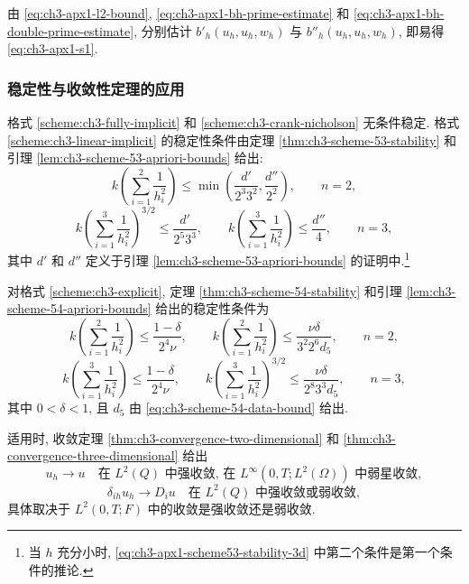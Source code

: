 \begin{Proof}
由 \eqref{eq:ch3-apx1-l2-bound}, \eqref{eq:ch3-apx1-bh-prime-estimate} 和 \eqref{eq:ch3-apx1-bh-double-prime-estimate}, 分别估计 $b'_h(u_h,u_h,w_h)$ 与 $b''_h(u_h,u_h,w_h)$, 即易得 \eqref{eq:ch3-apx1-s1}.
\end{Proof}

\subsubsection{稳定性与收敛性定理的应用}
格式 \ref{scheme:ch3-fully-implicit} 和 \ref{scheme:ch3-crank-nicholson} 无条件稳定. 格式 \ref{scheme:ch3-linear-implicit} 的稳定性条件由定理 \ref{thm:ch3-scheme-53-stability} 和引理 \ref{lem:ch3-scheme-53-apriori-bounds} 给出:
\begin{equation}
k\left(\sum_{i=1}^2\frac1{h_i^2}\right)
\leq\min\left(\frac{d'}{2^3 3^2},\frac{d''}{2^2}\right),
\qquad n=2,
\label{eq:ch3-apx1-scheme53-stability-2d}
\end{equation}
\begin{equation}
k\left(\sum_{i=1}^3\frac1{h_i^2}\right)^{3/2}\leq\frac{d'}{2^5 3^3},
\qquad
k\left(\sum_{i=1}^3\frac1{h_i^2}\right)\leq\frac{d''}{4},
\qquad n=3,
\label{eq:ch3-apx1-scheme53-stability-3d}
\end{equation}
其中 $d'$ 和 $d''$ 定义于引理 \ref{lem:ch3-scheme-53-apriori-bounds} 的证明中.\footnote{当 $h$ 充分小时, \eqref{eq:ch3-apx1-scheme53-stability-3d} 中第二个条件是第一个条件的推论.}

对格式 \ref{scheme:ch3-explicit}, 定理 \ref{thm:ch3-scheme-54-stability} 和引理 \ref{lem:ch3-scheme-54-apriori-bounds} 给出的稳定性条件为
\begin{equation}
k\left(\sum_{i=1}^2\frac1{h_i^2}\right)\leq\frac{1-\delta}{2^4\nu},
\qquad
k\left(\sum_{i=1}^2\frac1{h_i^2}\right)\leq\frac{\nu\delta}{3^2 2^6d_5},
\qquad n=2,
\label{eq:ch3-apx1-scheme54-stability-2d}
\end{equation}
\begin{equation}
k\left(\sum_{i=1}^3\frac1{h_i^2}\right)\leq\frac{1-\delta}{2^4\nu},
\qquad
k\left(\sum_{i=1}^3\frac1{h_i^2}\right)^{3/2}\leq\frac{\nu\delta}{2^8 3^3d_5},
\qquad n=3,
\label{eq:ch3-apx1-scheme54-stability-3d}
\end{equation}
其中 $0<\delta<1$, 且 $d_5$ 由 \eqref{eq:ch3-scheme-54-data-bound} 给出.

适用时, 收敛定理 \ref{thm:ch3-convergence-two-dimensional} 和 \ref{thm:ch3-convergence-three-dimensional} 给出
\begin{equation}
u_h\to u\quad\text{在 $L^2(Q)$ 中强收敛, 在 $L^\infty(0,T;L^2(\Omega))$ 中弱星收敛},
\label{eq:ch3-apx1-velocity-convergence}
\end{equation}
\begin{equation}
\delta_{ih}u_h\to D_i u\quad\text{在 $L^2(Q)$ 中强收敛或弱收敛},
\label{eq:ch3-apx1-gradient-convergence}
\end{equation}
具体取决于 $L^2(0,T;F)$ 中的收敛是强收敛还是弱收敛.

